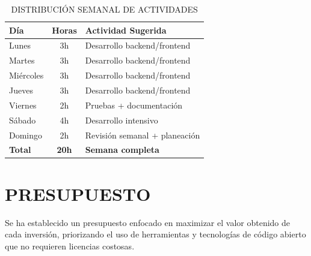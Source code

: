 \documentclass[spanish]{ieee_upb}
\begin{document}
\begin{table}[h!]
	\centering
	\caption{DISTRIBUCIÓN SEMANAL DE ACTIVIDADES}
	\begin{tabular}{lcp{6cm}}
		\toprule
		\textbf{Día}   & \textbf{Horas} & \textbf{Actividad Sugerida}   \\
		\midrule
		Lunes          & 3h             & Desarrollo backend/frontend   \\
		Martes         & 3h             & Desarrollo backend/frontend   \\
		Miércoles      & 3h             & Desarrollo backend/frontend   \\
		Jueves         & 3h             & Desarrollo backend/frontend   \\
		Viernes        & 2h             & Pruebas + documentación       \\
		Sábado         & 4h             & Desarrollo intensivo          \\
		Domingo        & 2h             & Revisión semanal + planeación \\
		\textbf{Total} & \textbf{20h}   & \textbf{Semana completa}      \\
		\bottomrule
	\end{tabular}
\end{table}


\newpage
\section{PRESUPUESTO}

Se ha establecido un presupuesto enfocado en maximizar el valor obtenido de cada inversión, priorizando el uso de herramientas y tecnologías de código abierto que no requieren licencias costosas.
\end{document}
